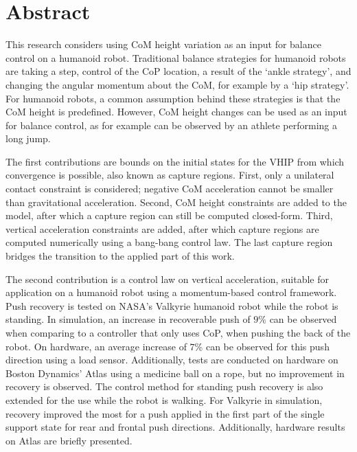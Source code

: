 %
\chapter*{Abstract}%

This research considers using \ac{CoM} height variation as an input for balance control on a humanoid robot. Traditional balance strategies for humanoid robots are taking a step, control of the \ac{CoP} location, a result of the `ankle strategy', and changing the angular momentum about the \ac{CoM}, for example by a `hip strategy'. For humanoid robots, a common assumption behind these strategies is that the \ac{CoM} height is predefined. However, \ac{CoM} height changes can be used as an input for balance control, as for example can be observed by an athlete performing a long jump. 

The first contributions are bounds on the initial states for the \ac{VHIP} from which convergence is possible, also known as capture regions. First, only a unilateral contact constraint is considered; negative \ac{CoM} acceleration cannot be smaller than gravitational acceleration. Second, \ac{CoM} height constraints are added to the model, after which a capture region can still be computed closed-form. Third, vertical acceleration constraints are added, after which capture regions are computed numerically using a bang-bang control law. The last capture region bridges the transition to the applied part of this work.

The second contribution is a control law on vertical acceleration, suitable for application on a humanoid robot using a momentum-based control framework. Push recovery is tested on NASA's Valkyrie humanoid robot while the robot is standing. In simulation, an increase in recoverable push of $9$\% can be observed when comparing to a controller that only uses \ac{CoP}, when pushing the back of the robot. On hardware, an average increase of $7$\% can be observed for this push direction using a load sensor. Additionally, tests are conducted on hardware on Boston Dynamics' Atlas using a medicine ball on a rope, but no improvement in recovery is observed. The control method for standing push recovery is also extended for the use while the robot is walking. For Valkyrie in simulation, recovery improved the most for a push applied in the first part of the single support state for rear and frontal push directions. Additionally, hardware results on Atlas are briefly presented.